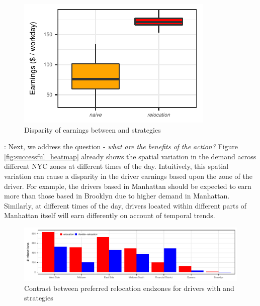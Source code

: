 \begin{figure}
	\includegraphics{figures/earnings_heatmap.pdf}
	\caption{Disparity of earnings between {\naive} and {\relocation} strategies}
	\label{fig:earnings_heatmap}
\end{figure}

: 
Next, we address the question - \textit{what are the benefits of the {\relocate} action?} Figure \ref{fig:successful_heatmap} already shows the spatial variation in the demand across different NYC zones at different times of the day. Intuitively, this spatial variation can cause a disparity in the driver earnings based upon the zone of the driver. For example, the drivers based in Manhattan should be expected to earn more than those based in Brooklyn due to higher demand in Manhattan. Similarly, at different times of the day, drivers located within different parts of Manhattan itself will earn differently on account of temporal trends.

\begin{figure}
	\centering
	\includegraphics{figures/relocation_endzones.pdf}
	\caption{Contrast between preferred relocation endzones for drivers with 
	{\relocation} and {\relocationflexible} strategies}
	\label{fig:relocation_endzones}
\end{figure}

